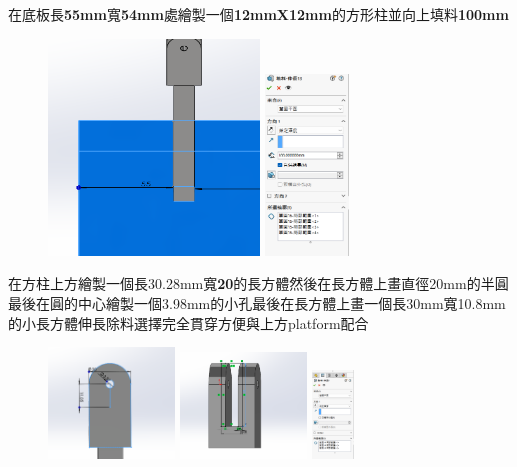 \noindent 在底板長\textbf{55mm}寬\textbf{54mm}處繪製一個\textbf{12mmX12mm}的方形柱並向上填料\textbf{100mm}

\begin{figure}[h!]
    \centering
    \includegraphics[width=0.5\textwidth]{./../images/6-1-28.png}
    \includegraphics[width=0.2\textwidth]{./../images/6-1-29.png}
\end{figure}

\noindent 在方柱上方繪製一個長30.28mm寬\textbf{20}的長方體然後在長方體上畫直徑20mm的半圓最後在圓的中心繪製一個3.98mm的小孔最後在長方體上畫一個長30mm寬10.8mm的小長方體伸長除料選擇完全貫穿方便與上方platform配合

\begin{figure}[h!]
    \centering
    \includegraphics[width=0.3\textwidth]{./../images/6-1-30.png}
    \includegraphics[width=0.3\textwidth]{./../images/6-1-31.png}
    \includegraphics[width=0.1\textwidth]{./../images/6-1-32.png}
\end{figure}

